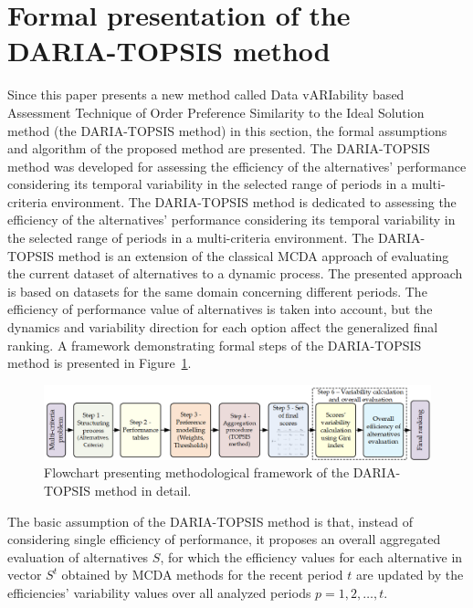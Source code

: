\documentclass[5p,times]{elsarticle}
\begin{document}
\section{Formal presentation of the DARIA-TOPSIS method}
\label{sec:methodology}
Since this paper presents a new method called Data vARIability based Assessment Technique of Order Preference Similarity to the Ideal Solution method (the DARIA-TOPSIS method) in this section, the formal assumptions and algorithm of the proposed method are presented. The DARIA-TOPSIS method was developed for assessing the efficiency of the alternatives' performance considering its temporal variability in the selected range of periods in a multi-criteria environment. The DARIA-TOPSIS method is dedicated to assessing the efficiency of the alternatives' performance considering its temporal variability in the selected range of periods in a multi-criteria environment. The DARIA-TOPSIS method is an extension of the classical MCDA approach of evaluating the current dataset of alternatives to a dynamic process. The presented approach is based on datasets for the same domain concerning different periods. The efficiency of performance value of alternatives is taken into account, but the dynamics and variability direction for each option affect the generalized final ranking. A framework demonstrating formal steps of the DARIA-TOPSIS method is presented in Figure~\ref{fig:methodologicalFramework}.

\begin{figure}[ht!]
    \centering
    \includegraphics[width=\linewidth]{SCSfram_methodology.png}
    \caption{Flowchart presenting methodological framework of the DARIA-TOPSIS method in detail.}
    \label{fig:methodologicalFramework}
\end{figure}

The basic assumption of the DARIA-TOPSIS method is that, instead of considering single efficiency of performance, it proposes an overall aggregated evaluation of alternatives $S$, for which the efficiency values for each alternative in vector $S^{t}$ obtained by MCDA methods for the recent period $t$ are updated by the efficiencies' variability values over all analyzed periods $p = 1, 2, \ldots, t$.
\end{document}
